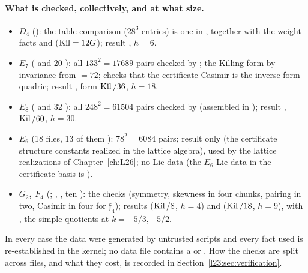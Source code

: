 \paragraph{What is checked, collectively, and at what size.}
\begin{itemize}
\item \textbf{$D_4$} (): the table comparison  ($28^3$ entries) is one
   in , together with the weight facts and  ($\operatorname{Kil}=12G$); result
  , $h=6$.
\item \textbf{$E_7$} ( and 20
  ): all $133^2=17689$ pairs checked by ; the Killing
  form by invariance from  $=72$;  checks that the certificate Casimir is the inverse-form quadric;
  result , form $\operatorname{Kil}/36$, $h=18$.
\item \textbf{$E_8$} ( and 32 ):
  all $248^2=61504$ pairs checked by  (assembled in ); result , $\operatorname{Kil}/60$, $h=30$.
\item \textbf{$E_6$} (18  files, 13 of them ): $78^2=6084$ pairs; result only
   (the certificate structure constants realized in the lattice algebra), used by the lattice realizations of
  Chapter~\ref{ch:L26}; no Lie data (the $E_6$ Lie data in the certificate basis is ).
\item \textbf{$G_2$, $F_4$} (; , , ten ): the
   checks (symmetry, skewness in four chunks, pairing in two, Casimir in four for $\mathfrak f_4$); results
   ($\operatorname{Kil}/8$, $h=4$) and  ($\operatorname{Kil}/18$, $h=9$), with ,  the simple quotients at
  $k=-5/3,-5/2$.
\end{itemize}
In every case the data were generated by untrusted scripts and every fact
used is re-established in the kernel; no data file contains a  or . How the checks are split across files,
and what they cost, is recorded in Section~\ref{l23:sec:verification}.

